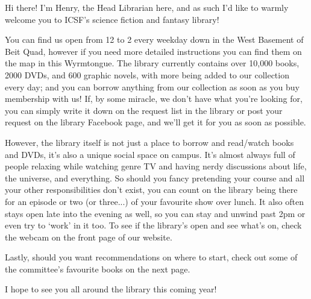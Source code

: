 Hi there! I'm Henry, the Head Librarian here, and as such I'd like to warmly welcome you to ICSF's science fiction and fantasy library! 

You can find us open from 12 to 2 every weekday down in the West Basement of Beit Quad, however if you need more detailed instructions you can find them on the map in this Wyrmtongue. The library currently contains over 10,000 books, 2000 DVDs, and 600 graphic novels, with more being added to our collection every day; and you can borrow anything from our collection as soon as you buy membership with us! If, by some miracle, we don't have what you're looking for, you can simply write it down on the request list in the library or post your request on the library Facebook page, and we'll get it for you as soon as possible.

However, the library itself is not just a place to borrow and read/watch books and DVDs, it's also a unique social space on campus. It's almost always full of people relaxing while watching genre TV and having nerdy discussions about life, the universe, and everything. So should you fancy pretending your course and all your other responsibilities don't exist, you can count on the library being there for an episode or two (or three...) of your favourite show over lunch. It also often stays open late into the evening as well, so you can stay and unwind past 2pm or even try to `work' in it too. To see if the library's open and see what's on, check the webcam on the front page of our website.

Lastly, should you want recommendations on where to start, check out some of the committee's favourite books on the next page.

I hope to see you all around the library this coming year!